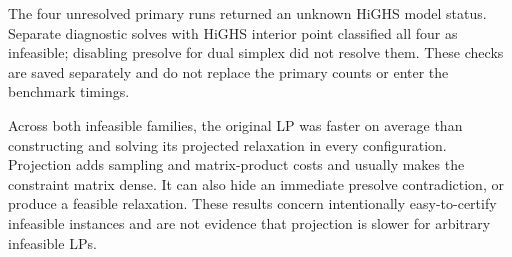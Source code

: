 \documentclass[12pt,letterpaper,oneside]{report}
\theoremstyle{definition}
\begin{document}
\par\medskip
\noindent\begin{minipage}{\linewidth}
\small\linespread{1}\selectfont\centering
\setlength{\tabcolsep}{4pt}
\renewcommand{\arraystretch}{1.08}
\label{tab:fresh-stress-status}
\medskip
{}%
\ifdim\wd0>\linewidth
  \resizebox{\linewidth}{!}{\usebox0}
\else
  \usebox0
\fi
\end{minipage}
\par\medskip

The four unresolved primary runs returned an unknown HiGHS model status.
Separate diagnostic solves with HiGHS interior point classified all four
as infeasible; disabling presolve for dual simplex did not resolve them.
These checks are saved separately and do not replace the primary counts
or enter the benchmark timings.

Across both infeasible families, the original LP was faster on average
than constructing and solving its projected relaxation in every
configuration. Projection adds sampling and matrix-product costs and
usually makes the constraint matrix dense. It can also hide an immediate
presolve contradiction, or produce a feasible relaxation. These results
concern intentionally easy-to-certify infeasible instances and are not
evidence that projection is slower for arbitrary infeasible LPs.
\end{document}
